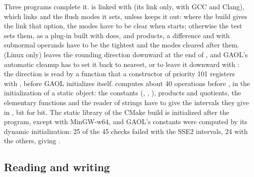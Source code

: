 \documentclass[12pt,a4paper,twoside,openright]{book}
\begin{document}
\medskip
Three programs complete it.  is linked with
 (its link only, with GCC and Clang), which links
 and the flush modes it sets, unless
 keeps it out: where the build gives the link that
option, the modes have to be clear when  starts; otherwise the
test sets them, as a plug-in built with  does, and products,
a difference and  with subnormal operands have to be the tightest
and the modes cleared after them.\newinvfive{} 
(Linux only) leaves the rounding direction downward at the end of
, and GAOL's automatic cleanup has to set it back to nearest,
or to leave it downward with : the
direction is read by a function that a constructor of priority 101 registers
with , before GAOL initializes itself.
 computes about 40 operations before
, in the initialization of a static object: the constants
(, , ), products and quotients, the
elementary functions and the reader of strings have to give the intervals
they give in , bit for bit. The static library of the CMake
build is initialized after the program, except with MinGW-w64, and GAOL's
constants were computed by its dynamic initialization: 25 of the 45 checks
failed with the SSE2 intervals, 24 with the others,  giving
\code{[-0, 0]}.\newinvfive

\subsection{Reading and writing}
\end{document}
